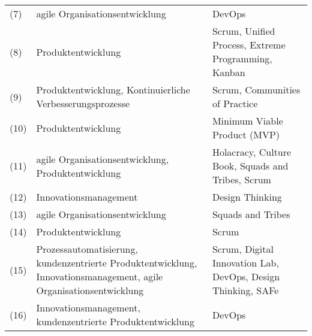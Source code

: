 \begin{sidewaystable}[ht]
\begin{tabular}{|l|p{10cm}|p{10cm}|}
		(7)                & agile Organisationsentwicklung                                                                                     & DevOps                                                                                           \\
		(8) & Produktentwicklung                                                                                                 & Scrum, Unified Process, Extreme Programming, Kanban                                              \\
		(9)           & Produktentwicklung, Kontinuierliche Verbesserungsprozesse                                                          & Scrum, Communities of Practice                                                                   \\
		(10)          & Produktentwicklung                                                                                                 & Minimum Viable Product (MVP)                                                                   \\
		(11) & agile Organisationsentwicklung, Produktentwicklung                                                                 & Holacracy, Culture Book, Squads and Tribes, Scrum                                                \\
		(12)                                & Innovationsmanagement                                                                                              & Design Thinking                                                                                  \\
		(13)                                & agile Organisationsentwicklung                                                                                     & Squads and Tribes                                                                                \\
		(14)          & Produktentwicklung                                                                                                 & Scrum                                                                                            \\
		(15)              & Prozessautomatisierung, kundenzentrierte Produktentwicklung, Innovationsmanagement, agile Organisationsentwicklung & Scrum, Digital Innovation Lab, DevOps, Design Thinking, SAFe                                     \\
		(16)                            & Innovationsmanagement, kundenzentrierte Produktentwicklung                                                         & DevOps                                                                                           \\

\end{tabular}
\end{sidewaystable}
